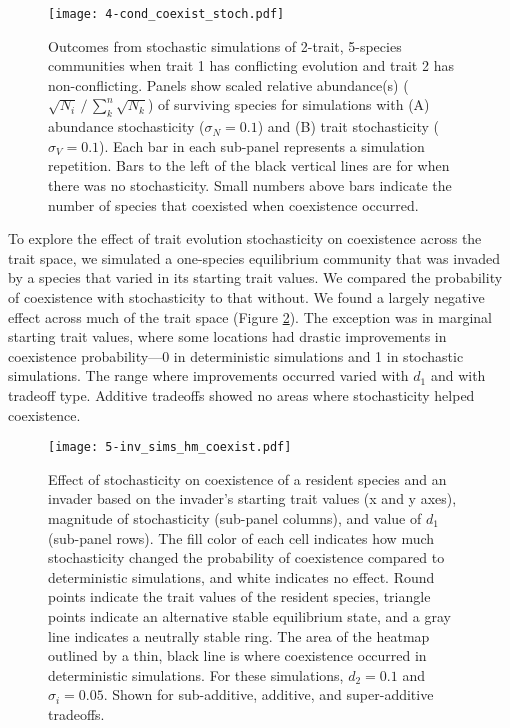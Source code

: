 \begin{figure}[ht!]
\centering
\texttt{[image: 4-cond\_coexist\_stoch.pdf]}
\caption{Outcomes from stochastic simulations of 2-trait, 5-species communities 
    when trait 1 has conflicting evolution and trait 2 has non-conflicting.
    Panels show scaled relative abundance(s)
    ($\sqrt{N_i} \, / \, \sum_k^n{\sqrt{N_k}}$) 
    of surviving species for simulations with
    (A) abundance stochasticity ($\sigma_N = 0.1$) and
    (B) trait stochasticity ($\sigma_V = 0.1$).
    Each bar in each sub-panel represents a simulation repetition.
    Bars to the left of the black vertical lines are for when there was no 
    stochasticity.
    Small numbers above bars indicate the number of species that coexisted
    when coexistence occurred.}
\label{fig:conditional-coexistence-stoch}
\end{figure}



To explore the effect of trait evolution stochasticity on coexistence across 
the trait space,
we simulated a one-species equilibrium community that was invaded by 
a species that varied in its starting trait values.
We compared the probability of coexistence with stochasticity to that without.
We found a largely negative effect across much of the trait space
(Figure \ref{fig:inv-sims-heatmap-coexist}).
The exception was in marginal starting trait values, where some locations
had drastic improvements in coexistence probability---0 in deterministic 
simulations and 1 in stochastic simulations.
The range where improvements occurred varied with $d_1$ and with tradeoff type.
Additive tradeoffs showed no areas where stochasticity helped coexistence.

\begin{figure}[ht!]
\centering
\texttt{[image: 5-inv\_sims\_hm\_coexist.pdf]}
\caption{Effect of stochasticity on coexistence of a resident species and 
    an invader based on the invader's starting trait values (x and y axes),
    magnitude of stochasticity (sub-panel columns), and 
    value of $d_1$ (sub-panel rows).
    The fill color of each cell indicates how much stochasticity changed
    the probability of coexistence compared to deterministic simulations,
    and white indicates no effect.
    Round points indicate the trait values of the resident species,
    triangle points indicate an alternative stable equilibrium state, 
    and a gray line indicates a neutrally stable ring.
    The area of the heatmap outlined by a thin, black line is where
    coexistence occurred in deterministic simulations.
    For these simulations, $d_2 = 0.1$ and $\sigma_i = 0.05$.
    Shown for sub-additive, additive, and super-additive tradeoffs.}
\label{fig:inv-sims-heatmap-coexist}
\end{figure}
